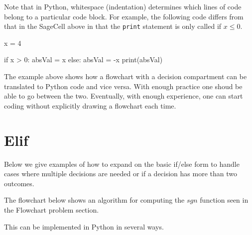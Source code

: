 \documentclass{ximera}
\begin{document}
Note that in Python, whitespace (indentation) determines which lines of code belong to a particular code block. For example, the following code differs from that in the SageCell above in that the \verb|print| statement is only called if $x\leq 0$.

\begin{sageCell}
x = 4

if x > 0:
	absVal = x
else:
	absVal = -x
	print(absVal)
\end{sageCell}

The example above shows how a flowchart with a decision compartment can be translated to Python code and vice versa. With enough practice one shoud be able to go between the two. Eventually, with enough experience, one can start coding without explicitly drawing a flowchart each time.

\section{Elif}

Below we give examples of how to expand on the basic if/else form to handle cases where multiple decisions are needed or if a decision has more than two outcomes.

The flowchart below shows an algorithm for computing the $sgn$ function seen in the Flowchart problem section.

\begin{center}
\end{center}

This can be implemented in Python in several ways.
\end{document}
